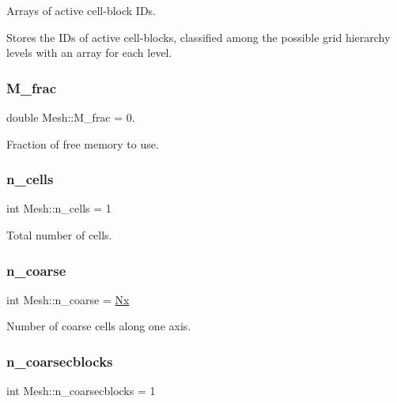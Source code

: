 Arrays of active cell-\/block I\+Ds. 

Stores the I\+Ds of active cell-\/blocks, classified among the possible grid hierarchy levels with an array for each level. \mbox{\label{classMesh_a33f7215b6094f37bd64d01f09804bf32}} 
\subsubsection{\texorpdfstring{M\+\_\+frac}{M\_frac}}
{\footnotesize\ttfamily double Mesh\+::\+M\+\_\+frac = 0.}



Fraction of free memory to use. 

\mbox{\label{classMesh_afac537fd7ffc8ad618d55fe619b4a37e}} 
\subsubsection{\texorpdfstring{n\+\_\+cells}{n\_cells}}
{\footnotesize\ttfamily int Mesh\+::n\+\_\+cells = 1}



Total number of cells. 

\mbox{\label{classMesh_a4605f1f36e3e751c5cf7792afc1d941f}} 
\subsubsection{\texorpdfstring{n\+\_\+coarse}{n\_coarse}}
{\footnotesize\ttfamily int Mesh\+::n\+\_\+coarse = \hyperlink{cppspec_8h_af093d941bc37a7a3f38e1db6593d9633}{Nx}}



Number of coarse cells along one axis. 

\mbox{\label{classMesh_a1a2bbc581d1542d2c5cdc273d509a89a}} 
\subsubsection{\texorpdfstring{n\+\_\+coarsecblocks}{n\_coarsecblocks}}
{\footnotesize\ttfamily int Mesh\+::n\+\_\+coarsecblocks = 1}



